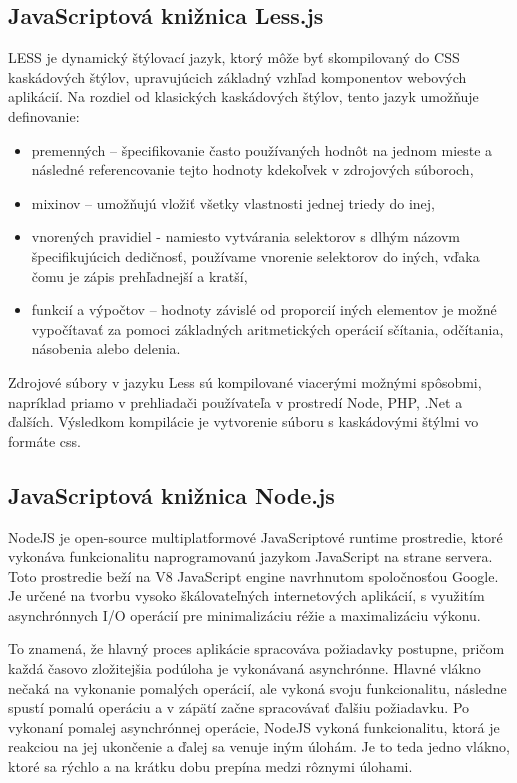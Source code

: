 \subsection{JavaScriptová knižnica Less.js}
LESS je dynamický štýlovací jazyk, ktorý môže byť skompilovaný do CSS kaskádových štýlov, upravujúcich základný vzhľad komponentov webových aplikácií. Na rozdiel od klasických kaskádových štýlov, tento jazyk umožňuje definovanie: 
\begin{itemize}
	\item premenných -- špecifikovanie často používaných hodnôt na jednom mieste a následné referencovanie tejto hodnoty kdekoľvek v zdrojových súboroch,
	\item mixinov -- umožňujú vložiť všetky vlastnosti jednej triedy do inej,
	\item vnorených pravidiel - namiesto vytvárania selektorov s dlhým názovm špecifikujúcich dedičnosť, používame vnorenie selektorov do iných, vďaka čomu je zápis prehľadnejší a kratší,
	\item funkcií a výpočtov -- hodnoty závislé od proporcií iných elementov je možné vypočítavať za pomoci základných aritmetických operácií sčítania, odčítania, násobenia alebo delenia.
\end{itemize}
Zdrojové súbory v jazyku Less sú kompilované viacerými možnými spôsobmi, napríklad priamo v prehliadači používateľa v prostredí Node, PHP, .Net a ďalších. Výsledkom kompilácie je vytvorenie súboru s kaskádovými štýlmi vo formáte css.

\subsection{JavaScriptová knižnica Node.js}
NodeJS je open-source multiplatformové JavaScriptové runtime prostredie, ktoré vykonáva funkcionalitu naprogramovanú jazykom JavaScript na strane servera. Toto prostredie beží na V8 JavaScript engine navrhnutom spoločnosťou Google. Je určené na tvorbu vysoko škálovateľných internetových aplikácií, s využitím asynchrónnych I/O operácií \cite{doi:10.1109/MIC.2010.145} pre minimalizáciu réžie a maximalizáciu výkonu. 

To znamená, že hlavný proces aplikácie spracováva požiadavky postupne, pričom každá časovo zložitejšia podúloha je vykonávaná asynchrónne. Hlavné vlákno nečaká na vykonanie pomalých operácií, ale vykoná svoju funkcionalitu, následne spustí pomalú operáciu a v zápätí začne spracovávať ďalšiu požiadavku. Po vykonaní pomalej asynchrónnej operácie, NodeJS vykoná funkcionalitu, ktorá je reakciou na jej ukončenie a ďalej sa venuje iným úlohám. Je to teda jedno vlákno, ktoré sa rýchlo a na krátku dobu prepína medzi rôznymi úlohami. 


